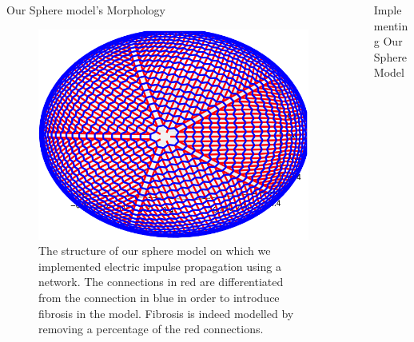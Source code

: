 \documentclass[final,hyperref={pdfpagelabels=false}]{beamer}
\begin{document}
\begin{frame}[t]
\begin{columns}[t]
\begin{column}{.465\textwidth}
\begin{block}{Our Sphere model's Morphology}

\begin{figure}
\includegraphics[width=0.6\linewidth]{connectome}
\caption{The structure of our sphere model on which we implemented electric impulse propagation using a network. The connections in red are differentiated from the connection in blue in order to introduce fibrosis in the model. Fibrosis is indeed modelled by removing a percentage of the red connections. }
\end{figure}

\end{block}




\end{column} %

\begin{column}{.03\textwidth}\end{column} %
 
\begin{column}{.465\textwidth} %









\begin{block}{Implementing Our Sphere Model}





\end{block}
\end{column}
\end{columns}
\end{frame}
\end{document}
